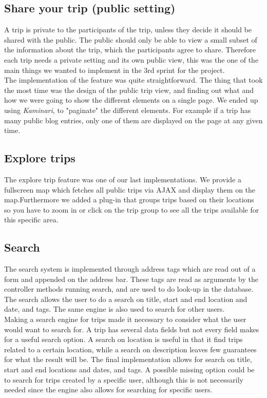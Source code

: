 \documentclass[a4paper]{article}
\begin{document}
\subsection{Share your trip (public setting)}
A trip is private to the participants of the trip, unless they decide it should be shared with the public. The public should only be able to view a small subset of the information about the trip, which the participants agree to share. Therefore each trip needs a private setting and its own public view, this was the one of the main things we wanted to implement in the 3rd sprint for the project. \\

\noindent
The implementation of the feature was quite straightforward. The thing that took the most time was the design of the public trip view, and finding out what and how we were going to show the different elements on a single page. We ended up using \emph{Kaminari}\cite{kaminari}, to "paginate" the different elements. For example if a trip has many public blog entries, only one of them are displayed on the page at any given time. 

\subsection{Explore trips}
The explore trip feature was one of our last implementations. We provide a fullscreen map which fetches all public trips via AJAX and display them on the map.Furthermore we added a plug-in that groups trips based on their locations so you have to zoom in or click on the trip group to see all the trips available for this specific area.

\subsection{Search}
The search system is implemented through address tags which are read out of a form and appended on the address bar. These tags are read as arguments by the controller methods running search, and are used to do look-up in the database. The search allows the user to do a search on title, start and end location and date, and tags. The same engine is also used to search for other users.\\

\noindent
Making a search engine for trips made it necessary to consider what the user would want to search for. A trip has several data fields but not every field makes for a useful search option. A search on location is useful in that it find trips related to a certain location, while a search on description leaves few guarantees for what the result will be. The final implementation allows for search on title, start and end locations and dates, and tags. A possible missing option could be to search for trips created by a specific user, although this is not necessarily needed since the engine also allows for searching for specific users.\\
\end{document}
